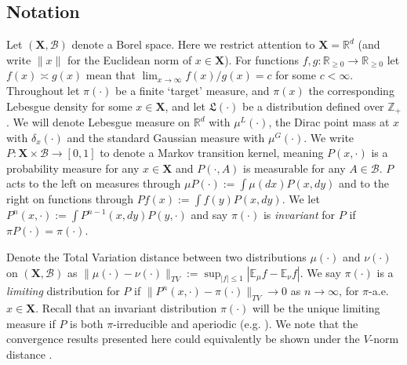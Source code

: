 \documentclass[bj,numbers,noshowframe]{imsart}
\newcommand{\X}{\mathbf{X}}
\newcommand{\R}{\mathbb{R}}
\newcommand{\B}{\mathcal{B}}
\theoremstyle{definition}
\theoremstyle{plain}
\theoremstyle{definition}
\begin{document}

\subsection{Notation} Let $(\X,\B)$ denote a Borel space.  Here we restrict attention to $\X = \R^d$ (and write $\|x\|$ for the Euclidean norm of $x \in \X$).  For functions $f,g:\R_{\geq 0} \to \R_{\geq 0}$ let $f(x) \asymp g(x)$ mean that $\lim_{x \to \infty} f(x)/g(x) = c$ for some $c<\infty$.  Throughout let $\pi(\cdot)$ be a finite `target' measure, and $\pi(x)$ the corresponding Lebesgue density for some $x \in \X$, and let $\mathfrak{L}(\cdot)$ be a distribution defined over $\mathbb{Z}_+$.  We will denote Lebesgue measure on $\R^d$ with $\mu^L(\cdot)$, the Dirac point mass at $x$ with $\delta_x(\cdot)$ and the standard Gaussian measure with $\mu^G(\cdot)$. We write $P: \X \times \B \to [0,1]$ to denote a Markov transition kernel, meaning $P(x,\cdot)$ is a probability measure for any $x \in \X$ and $P(\cdot,A)$ is measurable for any $A \in \B$.  $P$ acts to the left on measures through $\mu P(\cdot) := \int \mu(dx)P(x,dy)$ and to the right on functions through $Pf(x) := \int f(y)P(x,dy)$.  We let $P^n(x,\cdot) := \int P^{n-1}(x,dy)P(y,\cdot)$ and say $\pi(\cdot)$ is \emph{invariant} for $P$ if $\pi P(\cdot) = \pi(\cdot)$.

Denote the Total Variation distance between two distributions $\mu(\cdot)$ and $\nu(\cdot)$ on $(\X,\B)$ as $\|\mu(\cdot) - \nu(\cdot)\|_{TV} := \sup_{|f| \leq 1}|\mathbb{E}_\mu f - \mathbb{E}_\nu f|$.  We say $\pi(\cdot)$ is a \emph{limiting} distribution for $P$ if $\|P^n(x,\cdot) - \pi(\cdot)\|_{TV} \to 0$ as $n \to \infty$, for $\pi$-a.e. $x \in \X$.  Recall that an invariant distribution $\pi(\cdot)$ will be the unique limiting measure if $P$ is both $\pi$-irreducible and aperiodic (e.g.  \citep{tierney1994markov}).  We note that the convergence results presented here could equivalently be shown under the $V$-norm distance \citep{roberts1997geometric}.
\end{document}
